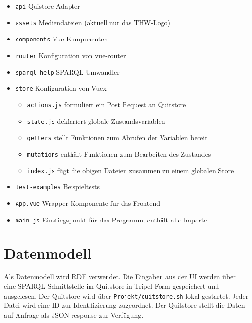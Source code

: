 \documentclass[a4paper,11pt,oneside, titlepage]{article}
\begin{document}
  \newpage


    \begin{itemize}
      \item \verb+api+ Quistore-Adapter
      \item \verb+assets+ Mediendateien (aktuell nur das THW-Logo)
      \item \verb+components+ Vue-Komponenten
      \item \verb+router+ Konfiguration von vue-router
      \item \verb+sparql_help+ SPARQL Umwandler
      \item \verb+store+ Konfiguration von Vuex
        \begin{itemize}
          \item \verb+actions.js+ formuliert ein Post Request an Quitstore
          \item \verb+state.js+ deklariert globale Zustandsvariablen
          \item \verb+getters+ stellt Funktionen zum Abrufen der Variablen bereit
          \item \verb+mutations+ enthält Funktionen zum Bearbeiten des Zustandes
          \item \verb+index.js+ fügt die obigen Dateien zusammen zu einem globalen Store
        \end{itemize}
      \item \verb+test-examples+ Beispieltests
      \item \verb+App.vue+ Wrapper-Komponente für das Frontend
      \item \verb+main.js+ Einstiegspunkt für das Programm, enthält alle Importe
    \end{itemize}

\begin{minipage}{16cm}
\end{minipage}



\section{Datenmodell}
Als Datenmodell wird \gls{RDF} verwendet. Die Eingaben aus der UI werden über eine \gls{SPARQL}-Schnittstelle im \gls{Quitstore} in Tripel-Form gespeichert und ausgelesen. Der Quitstore wird über \verb+Projekt/quitstore.sh+ lokal gestartet. Jeder Datei wird eine ID zur Identifizierung zugeordnet. Der Quitstore stellt die Daten auf Anfrage als \gls{JSON}-response zur Verfügung.

  \newpage

  \printglossaries
\end{document}
